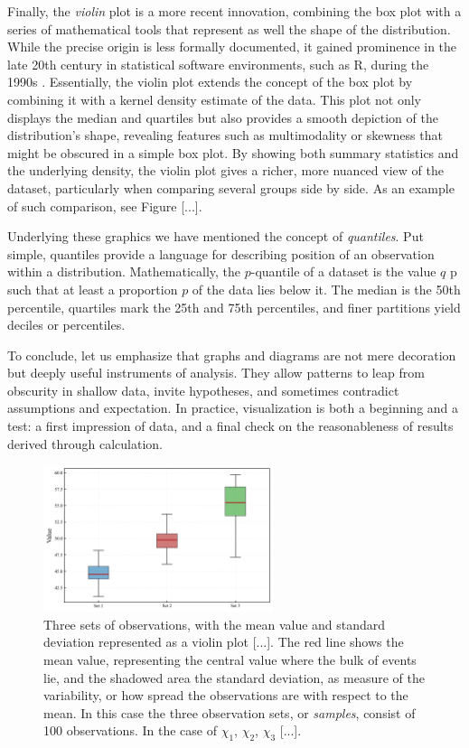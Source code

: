 \documentclass{book}
\begin{document}
\medskip

Finally, the \textit{violin} plot is a more recent innovation, combining the box plot with a series of mathematical tools that represent as well the shape of the distribution. While the precise origin is less formally documented, it gained prominence in the late 20th century in statistical software environments, such as R, during the 1990s \cite{hintze1997}. Essentially, the violin plot extends the concept of the box plot by combining it with a kernel density estimate of the data. This plot not only displays the median and quartiles but also provides a smooth depiction of the distribution’s shape, revealing features such as multimodality or skewness that might be obscured in a simple box plot. By showing both summary statistics and the underlying density, the violin plot gives a richer, more nuanced view of the dataset, particularly when comparing several groups side by side. As an example of such comparison, see Figure [...].

\medskip

Underlying these graphics we have mentioned the concept of \textit{quantiles}. Put simple, quantiles provide a language for describing position of an observation within a distribution. Mathematically, the $p$-quantile of a dataset is the value $q$ p such that at least a proportion $p$ of the data lies below it. The median is the 50th percentile, quartiles mark the 25th and 75th percentiles, and finer partitions yield deciles or percentiles. 

\medskip

To conclude, let us emphasize that graphs and diagrams are not mere decoration but deeply useful instruments of analysis. They allow patterns to leap from obscurity in shallow data, invite hypotheses, and sometimes contradict assumptions and expectation. In practice, visualization is both a beginning and a test: a first impression of data, and a final check on the reasonableness of results derived through calculation.

\begin{figure}[ht]
    \centering
    \includegraphics[width=0.6\textwidth]{figures/chapter1/measurements_boxplot.png}
    \caption{Three sets of observations, with the mean value and standard deviation represented as a violin plot [...]. The red line shows the mean value, representing the central value where the bulk of events lie, and the shadowed area the standard deviation, as measure of the variability, or how spread the observations are with respect to the mean. In this case the three observation sets, or \textit{samples}, consist of 100 observations. In the case of $\chi_1$, $\chi_2$, $\chi_3$ [...].}
    \label{fig:histogram1}
\end{figure}
\end{document}
